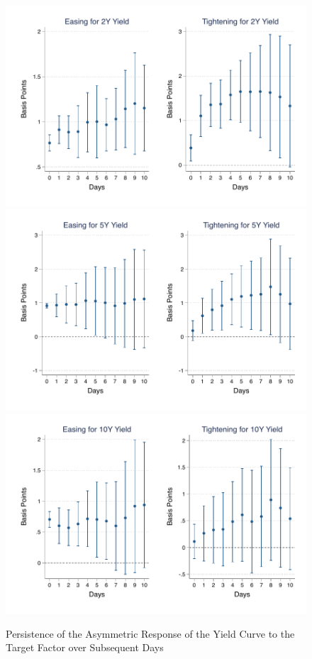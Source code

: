 \documentclass{article}
\begin{document}
\begin{figure}[tbph]
	\begin{center}
		\caption{Persistence of the Asymmetric Response of the Yield Curve to the Target Factor over Subsequent Days}
		\label{fig:persistasytrg}
		\includegraphics[trim={0.6cm 0cm 0.5cm 0cm},clip,height=.2\textheight,width=1\textwidth]{persistasytrggmxn02yr} \\
		\includegraphics[trim={0.6cm 0cm 0.5cm 0cm},clip,height=.2\textheight,width=1\textwidth]{persistasytrggmxn05yr} \\
		\includegraphics[trim={0.6cm 0cm 0.5cm 0cm},clip,height=.2\textheight,width=1\textwidth]{persistasytrggmxn10yr} \\

\end{center}
\end{figure}
\end{document}

